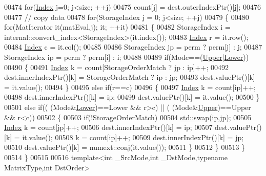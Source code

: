\begin{DoxyCode}
00474   \textcolor{keywordflow}{for}(\hyperlink{group___core___module_a554f30542cc2316add4b1ea0a492ff02}{Index} j=0; j<size; ++j)
00475     count[j] = dest.outerIndexPtr()[j];
00476   
00477   \textcolor{comment}{// copy data}
00478   \textcolor{keywordflow}{for}(StorageIndex j = 0; j<size; ++j)
00479   \{
00480     \textcolor{keywordflow}{for}(MatIterator it(matEval,j); it; ++it)
00481     \{
00482       StorageIndex i = internal::convert\_index<StorageIndex>(it.index());
00483       \hyperlink{group___core___module_a554f30542cc2316add4b1ea0a492ff02}{Index} r = it.row();
00484       \hyperlink{group___core___module_a554f30542cc2316add4b1ea0a492ff02}{Index} c = it.col();
00485       
00486       StorageIndex jp = perm ? perm[j] : j;
00487       StorageIndex ip = perm ? perm[i] : i;
00488       
00489       \textcolor{keywordflow}{if}(Mode==(\hyperlink{group__enums_gga39e3366ff5554d731e7dc8bb642f83cda6bcb58be3b8b8ec84859ce0c5ac0aaec}{Upper}|\hyperlink{group__enums_gga39e3366ff5554d731e7dc8bb642f83cda891792b8ed394f7607ab16dd716f60e6}{Lower}))
00490       \{
00491         \hyperlink{group___core___module_a554f30542cc2316add4b1ea0a492ff02}{Index} k = count[StorageOrderMatch ? jp : ip]++;
00492         dest.innerIndexPtr()[k] = StorageOrderMatch ? ip : jp;
00493         dest.valuePtr()[k] = it.value();
00494       \}
00495       \textcolor{keywordflow}{else} \textcolor{keywordflow}{if}(r==c)
00496       \{
00497         \hyperlink{group___core___module_a554f30542cc2316add4b1ea0a492ff02}{Index} k = count[ip]++;
00498         dest.innerIndexPtr()[k] = ip;
00499         dest.valuePtr()[k] = it.value();
00500       \}
00501       \textcolor{keywordflow}{else} \textcolor{keywordflow}{if}(( (Mode&\hyperlink{group__enums_gga39e3366ff5554d731e7dc8bb642f83cda891792b8ed394f7607ab16dd716f60e6}{Lower})==Lower && r>c) || ( (Mode&\hyperlink{group__enums_gga39e3366ff5554d731e7dc8bb642f83cda6bcb58be3b8b8ec84859ce0c5ac0aaec}{Upper})==Upper && r<c))
00502       \{
00503         \textcolor{keywordflow}{if}(!StorageOrderMatch)
00504           \hyperlink{endian_8c_a3ca5ecd34b04d6a243c054ac3a57f68d}{std::swap}(ip,jp);
00505         \hyperlink{group___core___module_a554f30542cc2316add4b1ea0a492ff02}{Index} k = count[jp]++;
00506         dest.innerIndexPtr()[k] = ip;
00507         dest.valuePtr()[k] = it.value();
00508         k = count[ip]++;
00509         dest.innerIndexPtr()[k] = jp;
00510         dest.valuePtr()[k] = numext::conj(it.value());
00511       \}
00512     \}
00513   \}
00514 \}
00515 
00516 \textcolor{keyword}{template}<\textcolor{keywordtype}{int} \_SrcMode,\textcolor{keywordtype}{int} \_DstMode,\textcolor{keyword}{typename} MatrixType,\textcolor{keywordtype}{int} DstOrder>

\end{DoxyCode}
